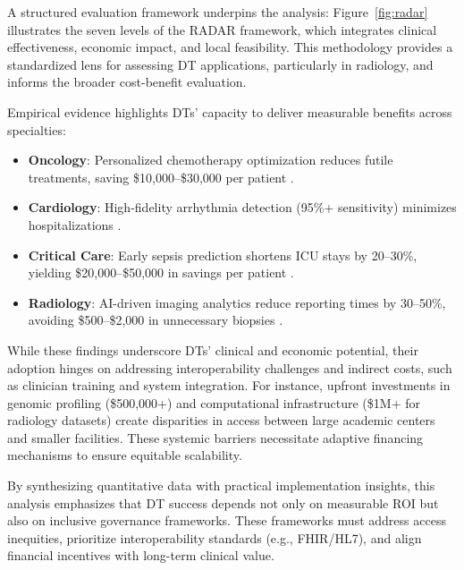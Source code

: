 \documentclass[10pt,a4paper]{article}
\begin{document}
A structured evaluation framework underpins the analysis: Figure~\ref{fig:radar} illustrates the seven levels of the RADAR framework, which integrates clinical effectiveness, economic impact, and local feasibility. This methodology provides a standardized lens for assessing DT applications, particularly in radiology, and informs the broader cost-benefit evaluation.

Empirical evidence highlights DTs’ capacity to deliver measurable benefits across specialties:

\begin{itemize}
  \item \textbf{Oncology}: Personalized chemotherapy optimization reduces futile treatments, saving \$10,000–\$30,000 per patient \cite{Wang2025}.
  \item \textbf{Cardiology}: High-fidelity arrhythmia detection (95\%+ sensitivity) minimizes hospitalizations \cite{Ahmed2023}.
  \item \textbf{Critical Care}: Early sepsis prediction shortens ICU stays by 20–30\%, yielding \$20,000–\$50,000 in savings per patient \cite{Mascret2024}.
  \item \textbf{Radiology}: AI-driven imaging analytics reduce reporting times by 30–50\%, avoiding \$500–\$2,000 in unnecessary biopsies \cite{Bocean2025}.
\end{itemize}

While these findings underscore DTs’ clinical and economic potential, their adoption hinges on addressing interoperability challenges and indirect costs, such as clinician training and system integration. For instance, upfront investments in genomic profiling (\$500,000+) and computational infrastructure (\$1M+ for radiology datasets) create disparities in access between large academic centers and smaller facilities. These systemic barriers necessitate adaptive financing mechanisms to ensure equitable scalability.

By synthesizing quantitative data with practical implementation insights, this analysis emphasizes that DT success depends not only on measurable ROI but also on inclusive governance frameworks. These frameworks must address access inequities, prioritize interoperability standards (e.g., FHIR/HL7), and align financial incentives with long-term clinical value.
\end{document}
